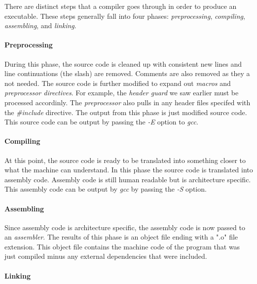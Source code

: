 \documentclass[../main.tex]{subfiles}
\begin{document}
There are distinct steps that a compiler goes through in order to produce an executable.  These steps generally fall into four phases: \textit{preprocessing}, \textit{compiling}, \textit{assembling}, and \textit{linking}\cite{c_nutshell}.

\paragraph{Preprocessing}

During this phase, the source code is cleaned up with consistent new lines and line continuations (the slash) are removed.  Comments are also removed as they a not needed.  The source code is further modified to expand out \textit{macros} and \textit{preprocessor directives}.  For example, the \textit{header guard} we saw earlier must be processed accordinly.  The \textit{preprocessor} also pulls in any header files specifed with the \textit{\#include} directive.  The output from this phase is just modified source code.  This source code can be output by passing the \textit{-E} option to \textit{gcc}.

\paragraph{Compiling}

At this point, the source code is ready to be translated into something closer to what the machine can understand.  In this phase the source code is translated into assembly code.  Assembly code is still human readable but is architecture specific.  This assembly code can be output by \textit{gcc} by passing the \textit{-S} option.

\paragraph{Assembling}

Since assembly code is architecture specific, the assembly code is now passed to an \textit{assembler}. The results of this phase is an object file ending with a ".o" file extension.  This object file contains the machine code of the program that was just compiled minus any external dependencies that were included.

\paragraph{Linking}
\end{document}

